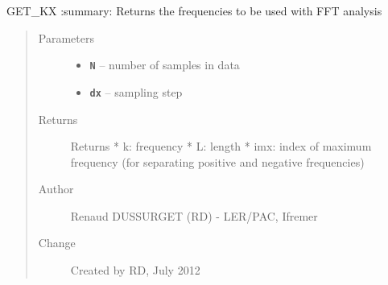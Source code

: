 \documentclass[letterpaper,10pt,english]{sphinxmanual}
\begin{document}

\begin{fulllineitems}
\label{altimetry.tools.spectrum:altimetry.tools.spectrum.get_kx}
GET\_KX
:summary: Returns the frequencies to be used with FFT analysis
\begin{quote}\begin{description}
\item[{Parameters}] \leavevmode\begin{itemize}
\item {} 
\textbf{\texttt{N}} -- number of samples in data

\item {} 
\textbf{\texttt{dx}} -- sampling step

\end{itemize}

\item[{Returns}] \leavevmode
Returns
* k: frequency
* L: length
* imx: index of maximum frequency (for separating positive and negative frequencies)

\item[{Author}] \leavevmode
Renaud DUSSURGET (RD) - LER/PAC, Ifremer

\item[{Change}] \leavevmode
Created by RD, July 2012

\end{description}\end{quote}

\end{fulllineitems}

\end{document}
